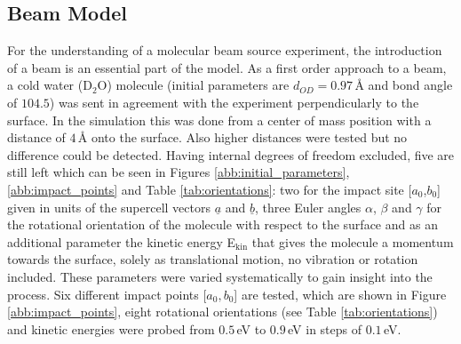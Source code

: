 \documentclass[11pt,DIV=13,BCOR=5mm,a4paper,headinclude]{scrbook}
\renewcommand{\vec}[1]{\underline{#1}}
\begin{document}
\subsection{Beam Model} \label{beammodel}
For the understanding of a molecular beam source experiment, the introduction of a beam is an essential part of the model.
As a first order approach to a beam, a cold water (D$_2$O) molecule (initial parameters are $d_{OD}=0.97\,$\AA{} and bond angle of $104.5$\textdegree) was sent in agreement with the experiment perpendicularly to the surface.
In the simulation this was done from a center of mass position with a distance of $4\,$\AA{} onto the surface.
Also higher distances were tested but no difference could be detected. %
Having internal degrees of freedom excluded, five are still left which can be seen in Figures \ref{abb:initial_parameters}, \ref{abb:impact_points} and Table \ref{tab:orientations}: two for the impact site [$a_0$,$b_0$] given in units of the supercell vectors $\vec{a}$ and $\vec{b}$, three Euler angles $\alpha$, $\beta$ and $\gamma$ for the rotational orientation of the molecule with respect to the surface and as an additional parameter the kinetic energy E$_\textrm{kin}$ that gives the molecule a momentum towards the surface, solely as translational motion, no vibration or rotation included.
These parameters were varied systematically to gain insight into the process.
Six different impact points [$a_0,b_0$] are tested, which are shown in Figure \ref{abb:impact_points}, eight rotational orientations (see Table \ref{tab:orientations}) and kinetic energies were probed from $0.5\,$eV to $0.9\,$eV in steps of $0.1\,$eV.
\end{document}
